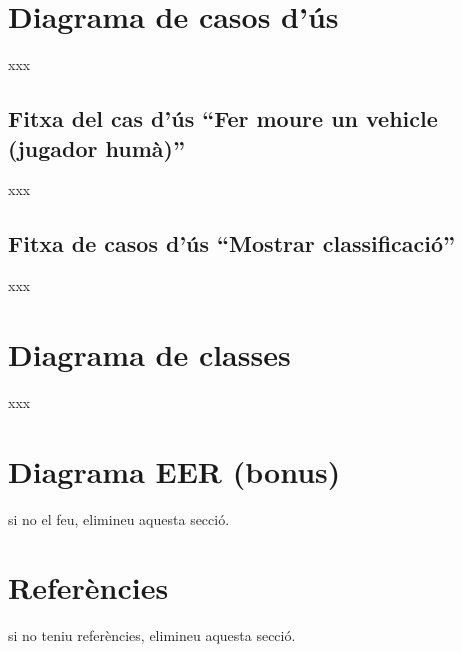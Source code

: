 \documentclass[12pt,a4paper]{article}
\begin{document}
\tableofcontents

\clearpage


\section{Diagrama de casos d'ús}
xxx

\subsection{Fitxa del cas d'ús ``Fer moure un vehicle (jugador humà)''}
xxx

\subsection{Fitxa de casos d'ús ``Mostrar classificació''}
xxx

\section{Diagrama de classes}
xxx

\section{Diagrama EER (bonus)}
si no el feu, elimineu aquesta secció.

\section*{Referències}
si no teniu referències, elimineu aquesta secció.
\end{document}
